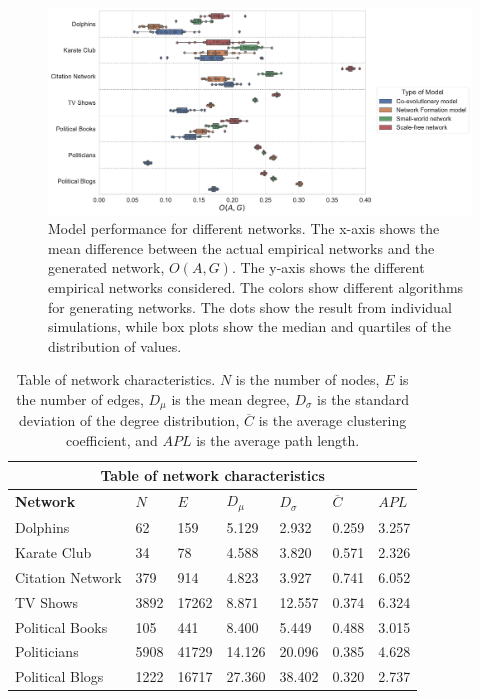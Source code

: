 \documentclass[11pt]{article}
\begin{document}
\begin{figure}[H]
    \centering
    \includegraphics[width=.99\linewidth]{../plots/overall/Model_Evaluation.pdf}
  \caption{Model performance for different networks. The x-axis shows the mean difference between the actual empirical networks and the generated network, $O(A, G)$. The y-axis shows the different empirical networks considered. The colors show different algorithms for generating networks. The dots show the result from individual simulations, while box plots show the median and quartiles of the distribution of values.}
  \label{fig:eval_mean}
\end{figure}

\begin{table}[H]
    \begin{center}
        
    \begin{tabular}{ |p{3cm}||p{1.6cm}|p{1.6cm}|p{1.6cm}|p{1.6cm}|p{1.6cm}|p{1.6cm}|}
        \hline
        \multicolumn{7}{|c|}{Table of network characteristics} \\
        \hline
        \bf{Network} & $N$ & $E$ & $D_{\mu}$ & $D_{\sigma}$ & $\overline{C}$ & $APL$\\
        \hline
        Dolphins   & 62    &159&   5.129&   2.932 &   0.259 & 3.257\\
        Karate Club &34	&78	&4.588&	3.820&	0.571&	2.326\\
        Citation Network & 379 &	914	& 4.823	& 3.927 & 0.741 & 6.052 \\
        TV Shows & 3892 & 17262&8.871 & 12.557 & 0.374&6.324\\
        Political Books &105 &	441	& 8.400 &	5.449 &	0.488 &	3.015\\
        Politicians&  5908 &41729 & 14.126 & 20.096 &	0.385 & 4.628\\
        Political Blogs &	1222 & 16717 & 27.360 & 38.402 & 0.320 & 2.737\\
        \hline
    \end{tabular}
    \end{center}
    \caption{Table of network characteristics. $N$ is the number of nodes, $E$ is the number of edges, $D_{\mu}$ is the mean degree, $D_{\sigma}$ is the standard deviation of the degree distribution, $\overline{C}$ is the average clustering coefficient, and $APL$ is the average path length. }
    \label{table:characteristics}
    \end{table}
\end{document}
